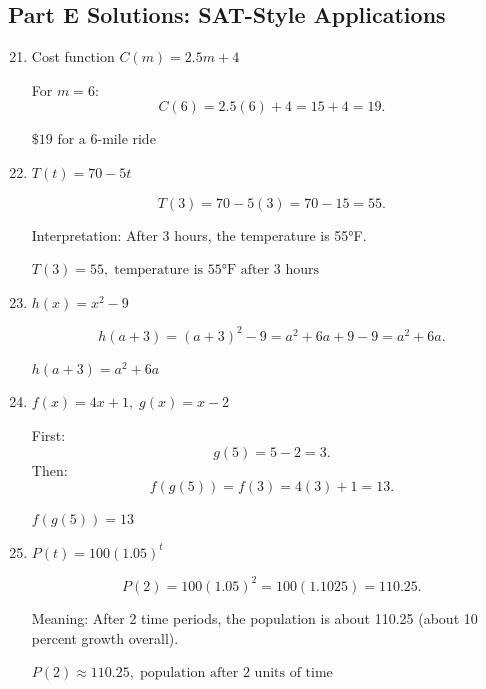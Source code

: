 \documentclass[14pt]{extarticle}
\begin{document}
\subsection*{Part E Solutions: SAT-Style Applications}
\begin{enumerate}
  \setcounter{enumi}{20}
  \item Cost function \(C(m) = 2.5m + 4\)

  For \(m = 6\):
  \[
  C(6) = 2.5(6) + 4 = 15 + 4 = 19.
  \]

  \(\boxed{\$19 \text{ for a 6-mile ride}}\)

  \item \(T(t) = 70 - 5t\)

  \[
  T(3) = 70 - 5(3) = 70 - 15 = 55.
  \]

  Interpretation: After 3 hours, the temperature is 55°F.

  \(\boxed{T(3)=55,\; \text{temperature is 55°F after 3 hours}}\)

  \item \(h(x) = x^2 - 9\)

  \[
  h(a + 3) = (a + 3)^2 - 9 = a^2 + 6a + 9 - 9 = a^2 + 6a.
  \]

  \(\boxed{h(a + 3) = a^2 + 6a}\)

  \item \(f(x) = 4x + 1,\; g(x) = x - 2\)

  First:
  \[
  g(5) = 5 - 2 = 3.
  \]
  Then:
  \[
  f(g(5)) = f(3) = 4(3) + 1 = 13.
  \]

  \(\boxed{f(g(5)) = 13}\)

  \item \(P(t) = 100(1.05)^t\)

  \[
  P(2) = 100(1.05)^2 = 100(1.1025) = 110.25.
  \]

  Meaning: After 2 time periods, the population is about 110.25 (about 10 percent growth overall).

  \(\boxed{P(2) \approx 110.25,\; \text{population after 2 units of time}}\)
\end{enumerate}





\end{document}
